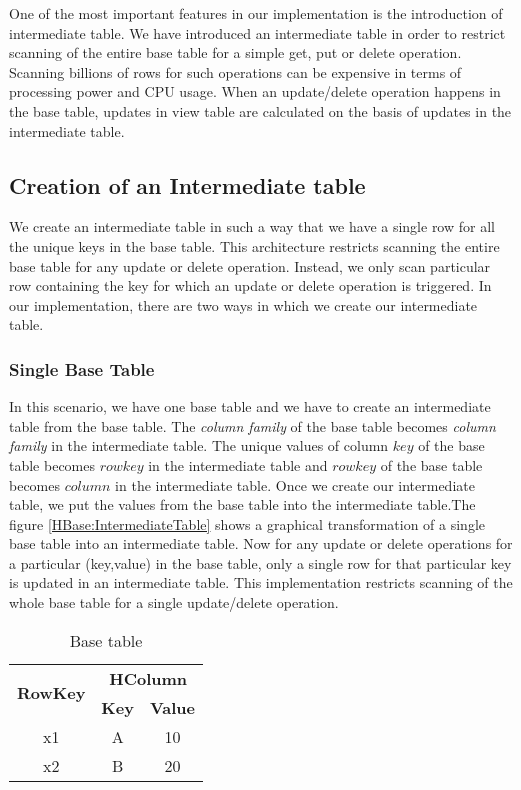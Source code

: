 \documentclass[11pt,a4paper,bibtotoc,idxtotoc,headsepline,footsepline,footexclude,BCOR12mm,DIV13]{scrbook}
\begin{document}
One of the most important features in our implementation is the introduction of intermediate table. We have introduced an intermediate table in order to restrict scanning of the entire base table for a simple get, put or delete operation. Scanning billions of rows for such operations can be expensive in terms of processing power and CPU usage. When an update/delete operation happens in the base table, updates in view table are calculated on the basis of updates in the intermediate table.

\subsection{Creation of an Intermediate table}
\label{subsec:intermediatetable}

We create an intermediate table in such a way that we have a single row for all the unique keys in the base table. This architecture restricts scanning the entire base table for any update or delete operation. Instead, we only scan particular row containing the key for which an update or delete operation is triggered. In our implementation, there are two ways in which we create our intermediate table.

\subsubsection{Single Base Table}
\label{Single Base Table}
In this scenario, we have one base table and we have to create an intermediate table from the base table. The \emph{column family} of the base table becomes \emph{column family} in the intermediate table. The unique values of column $key$ of the base table becomes $row key$ in the intermediate table and $row key$ of the base table becomes $column$ in the intermediate table. Once we create our intermediate table, we put the values from the base table into the intermediate table.The figure  \ref{HBase:IntermediateTable} shows a graphical transformation of a single base table into an intermediate table. Now for any update or delete operations for a particular (key,value) in the base table, only a single row for that particular key is updated in an intermediate table. This implementation restricts scanning of the whole base table for a single update/delete operation.

\begin{table*}[htb!]
	\centering
	\begin{tabular}{|c|c|c|}
		\hline
		\multirow{2}{*}{\textbf{RowKey}} & \multicolumn{2}{c|}{\textbf{HColumn}}\\
		\cline{2-3}
		& \textbf{Key} & \textbf{Value}\\
		\hline
		x1 & A & 10\\
		\hline
		x2 & B & 20\\
	
		\hline
	\end{tabular}
	\caption{Base table}
	\label{table:BaseTable}
\end{table*}
\end{document}
